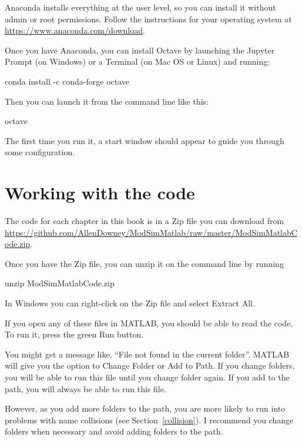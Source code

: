 \documentclass[main.tex]{subfiles}
\begin{document}
Anaconda installs everything at the user level, so you can install it without admin or root permissions.  Follow the instructions for your operating system at \url{https://www.anaconda.com/download}.

Once you have Anaconda, you can install Octave by launching the Jupyter Prompt (on Windows) or a Terminal (on Mac OS or Linux) and running:

\begin{code}
conda install -c conda-forge octave
\end{code}

Then you can launch it from the command line like this:

\begin{code}
octave
\end{code}

The first time you run it, a start window should appear to guide you through some configuration.


\section{Working with the code}


The code for each chapter in this book is in a Zip file you can download from \url{https://github.com/AllenDowney/ModSimMatlab/raw/master/ModSimMatlabCode.zip}.

Once you have the Zip file, you can unzip it on the command line by running

\begin{code}
unzip ModSimMatlabCode.zip
\end{code}

In Windows you can right-click on the Zip file and select {\sf Extract All}.

If you open any of these files in MATLAB, you should be able to read the code.  To run it, press the green {\sf Run} button.

You might get a message like, ``File not found in the current folder''.
MATLAB will give you the option to {\sf Change Folder} or {\sf Add to Path}.  If you change folders, you will be able to run this file until you change folder again.  If you add to the path, you will always be able to run this file.

However, as you add more folders to the path, you are more likely to run into problems with name collisions (see Section~\ref{collision}).  I recommend you change folders when necessary and avoid adding folders to the path.
\end{document}
